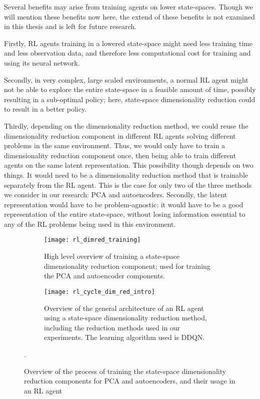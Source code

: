 Several benefits may arise from training agents on lower state-spaces. Though we will mention these benefits now here, the extend of these benefits is not examined in this thesis and is left for future research.

Firstly, RL agents training in a lowered state-space might need less training time and less observation data, and therefore less computational cost for training and using its neural network. 

Secondly, in very complex, large scaled environments, a normal RL agent might not be able to explore the entire state-space in a feasible amount of time, possibly resulting in a sub-optimal policy; here, state-space dimensionality reduction could to result in a better policy. 

Thirdly, depending on the dimensionality reduction method, we could reuse the dimensionality reduction component in different RL agents solving different problems in the same environment. Thus, we would only have to train a dimensionality reduction component once, then being able to train different agents on the same latent representation. This possibility though depends on two things. It would need to be a dimensionality reduction method that is trainable separately from the RL agent. This is the case for only two of the three methods we consider in our research: PCA and autoencoders. Secondly, the latent representation would have to be problem-agnostic: it would have to be a good representation of the entire state-space, without losing information essential to any of the RL problems being used in this environment.


\begin{figure}[h]
	\centering
	\begin{subfigure}[b]{0.20 \textwidth}
		\texttt{[image: rl\_dimred\_training]}
		\caption{High level overview of training a state-space dimensionality reduction component; used for training the PCA and autoencoder components.}
		\label{fig:rl_training}
	\end{subfigure}\hfill
	\begin{subfigure}[b]{0.50\textwidth}
		\texttt{[image: rl\_cycle\_dim\_red\_intro]}
    		\caption{Overview of the general architecture of an RL agent using a state-space dimensionality reduction method, including the reduction methods used in our experiments. The learning algorithm used is DDQN.}
    		\label{fig:rl_cycle_dimred}
	\end{subfigure}
	\caption{Overview of the process of training the state-space dimensionality reduction components for PCA and autoencoders, and their usage in an RL agent}.
\end{figure}
	

